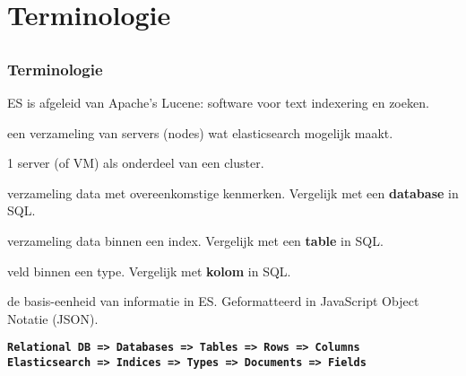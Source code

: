 \section{Terminologie}
\subsection{}
\begin{styleframe}
	\frametitle{Terminologie}
\pause
\begin{description}[<+>][documentbla]
	\item[Lucene] ES is afgeleid van Apache's Lucene: software voor text indexering en zoeken.
	\item[cluster] een verzameling van servers (nodes) wat elasticsearch mogelijk maakt.
	\item[node] 1 server (of VM) als onderdeel van een cluster.
	\item[index] verzameling data met overeenkomstige kenmerken. Vergelijk met een \textbf{database} in SQL.
	\item[type] verzameling data binnen een index. Vergelijk met een \textbf{table} in SQL.
	\item[field] veld binnen een type. Vergelijk met \textbf{kolom} in SQL.
	\item[document] de basis-eenheid van informatie in ES. Geformatteerd in JavaScript Object Notatie (JSON).\\
\end{description}
\pause
{\scriptsize{\tt\textbf{Relational DB => Databases => Tables => Rows => Columns\\
Elasticsearch => Indices => Types => Documents => Fields}}}
\end{styleframe}


